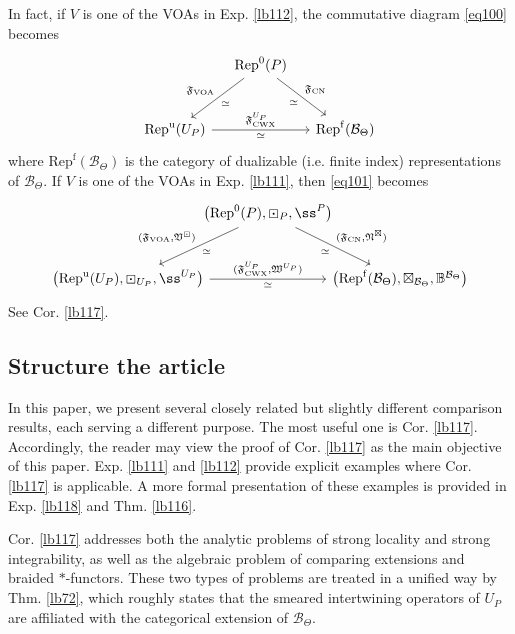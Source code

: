 \documentclass[11pt,b5paper,notitlepage]{article}
\theoremstyle{definition}
\theoremstyle{plain}
\newcommand{\fk}{\mathfrak}
\newcommand{\mc}{\mathcal}
\newcommand{\Rep}{\mathrm{Rep}}
\newcommand{\Repf}{\mathrm{Rep}^{\mathrm f}}
\newcommand{\CWX}{{\scriptscriptstyle \mathrm{CWX}}}
\newcommand{\VOA}{{\scriptscriptstyle \mathrm{VOA}}}
\newcommand{\CN}{{\scriptscriptstyle \mathrm{CN}}}
\newcommand{\RepUP}{\mathrm{Rep}^{\mathrm u}(U_P)}
\numberwithin{equation}{section}
\begin{document}
In fact, if $V$ is one of the VOAs in Exp. \ref{lb112}, the commutative diagram \eqref{eq100} becomes
\begin{equation}
\begin{tikzcd}[row sep=large, column sep=small]
             & \Rep^0(P) \arrow[ld,"\simeq","\fk F_\VOA"'] \arrow[rd,"\fk F_\CN","\simeq"'] &   \\
\RepUP \arrow[rr,"{\fk F^{U_P}_\CWX}","\simeq"'] &                         & \Repf(\mc B_\Theta)
\end{tikzcd}
\end{equation}
where $\Repf(\mc B_\Theta)$ is the category of dualizable (i.e. finite index) representations of $\mc B_\Theta$. If $V$ is one of the VOAs in Exp. \ref{lb111}, then \eqref{eq101} becomes
\begin{equation}
\begin{tikzcd}[row sep=large, column sep=-0.3cm]
             & \big(\Rep^0(P),\boxdot_P,\ss^P\big) \arrow[ld,"\simeq","{(\fk F_\VOA,\fk V^\boxdot)}"'] \arrow[rd,"{(\fk F_\CN,\fk N^\boxtimes)}","\simeq"'] &   \\
\big(\RepUP,\boxdot_{U_P},\ss^{U_P}\big) \arrow[rr,"{(\fk F^{U_P}_\CWX,\fk W^{U_P})}","\simeq"'] &                         & \big(\Repf(\mc B_\Theta),\boxtimes_{\mc B_\Theta},\mathbb B^{\mc B_\Theta}\big)
\end{tikzcd}
\end{equation}
See Cor. \ref{lb117}.


\subsection{Structure the article}


In this paper, we present several closely related but slightly different comparison results, each serving a different purpose. The most useful one is Cor. \ref{lb117}. Accordingly, the reader may view the proof of Cor. \ref{lb117} as the main objective of this paper. Exp. \ref{lb111} and \ref{lb112} provide explicit examples where Cor. \ref{lb117} is applicable. A more formal presentation of these examples is provided in Exp. \ref{lb118} and Thm. \ref{lb116}.

Cor. \ref{lb117} addresses both the analytic problems of strong locality and strong integrability, as well as the algebraic problem of comparing extensions and braided $*$-functors. These two types of problems are treated in a unified way by Thm. \ref{lb72}, which roughly states that the smeared intertwining operators of $U_P$ are affiliated with the categorical extension of $\mc B_\Theta$. 
\end{document}
